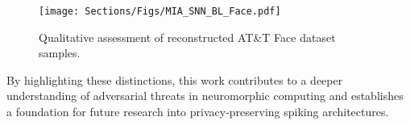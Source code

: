 \begin{figure}[ht]
  \centering
  \texttt{[image: Sections/Figs/MIA\_SNN\_BL\_Face.pdf]}
  \caption{Qualitative assessment of reconstructed AT\&T Face dataset samples.}
  \label{fig:visual_face}
\end{figure}





By highlighting these distinctions, this work contributes to a deeper understanding of adversarial threats in neuromorphic computing and establishes a foundation for future research into privacy-preserving spiking architectures.
































